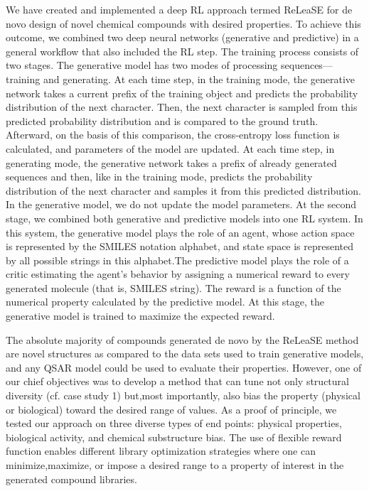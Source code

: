 \documentclass[conference]{IEEEtran}
\begin{document}
We have created and implemented a deep RL approach termed ReLeaSE for de novo design of novel chemical compounds with desired properties. To achieve this outcome, we combined two deep neural networks (generative and predictive) in a general workflow that also included the RL step. 
The training process consists of two stages. The generative model has two modes of processing sequences—training and generating. At each time step, in the training mode, the
generative network takes a current prefix of the training object and predicts the probability distribution of the next character. Then, the next character is sampled from this predicted probability distribution and is compared to the ground truth. Afterward, on the basis of this comparison, the cross-entropy loss function is calculated, and parameters of the model are updated. At each time step, in generating mode, the generative network takes a prefix of already generated sequences and then, like in the training mode, predicts the probability distribution of the next character and samples it from this predicted distribution. In the generative model, we do not update the model parameters. At the second stage, we combined both generative and predictive models into one RL system. In this system, the generative model plays the role of an agent, whose action space is represented by the SMILES notation alphabet, and state space is represented by all possible strings in this alphabet.The predictive model plays the role of a critic estimating the agent’s behavior by assigning a numerical reward to every generated molecule (that is, SMILES string). The reward is a function of the numerical property calculated by the predictive model. At this stage, the generative model is trained to maximize the expected reward.

The absolute majority of compounds generated de novo by the ReLeaSE method are novel structures as compared to the data sets used to train generative models, and any QSAR model could be used to evaluate their properties.
However, one of our chief objectives was to develop a method that can tune not only structural diversity (cf. case study 1) but,most importantly, also bias the property (physical or biological) toward the desired range of values.
As a proof of principle, we tested our approach on three diverse types of end points: physical properties, biological activity, and chemical substructure bias. The use of flexible reward function enables different library optimization strategies where one can minimize,maximize, or impose a desired range to a property of interest in the generated compound libraries. 
\end{document}

